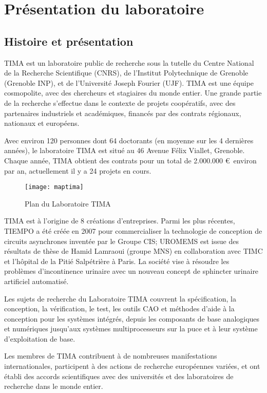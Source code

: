 \chapter{Présentation du laboratoire}
\label{chap:presentation}
\OnehalfSpacing

\section{Histoire et présentation}
TIMA est un laboratoire public de recherche sous la tutelle du Centre National de la Recherche Scientifique 
(CNRS), de l'Institut Polytechnique de Grenoble (Grenoble INP), et de l'Université Joseph Fourier (UJF). 
TIMA est une équipe cosmopolite, avec des chercheurs et stagiaires du monde entier. Une grande partie de la recherche s'effectue dans le contexte de projets coopératifs, avec des partenaires industriels et académiques, financés par des contrats régionaux, nationaux et européens.

Avec environ 120 personnes dont 64 doctorants (en moyenne sur les 4 dernières années), le laboratoire TIMA est situé au 46 Avenue Félix Viallet, Grenoble. Chaque année, TIMA obtient des contrats pour un total de 2.000.000 \euro\  environ par an, actuellement il y a 24 projets en cours.
\begin{figure}[h]
	\label{fig:maptima}
	\centering
	\texttt{[image: maptima]}
	\caption{Plan du Laboratoire TIMA}
	\vspace{-5mm}
\end{figure}

\justify
TIMA est à l'origine de 8 créations d'entreprises. Parmi les plus récentes, TIEMPO a été créée en 2007 pour commercialiser la technologie de conception de circuits asynchrones inventée par le Groupe CIS; UROMEMS est issue des résultats de thèse de Hamid Lamraoui (groupe MNS) en collaboration avec TIMC et l'hôpital de la Pitié Salpétrière à Paris. La société vise à résoudre les problèmes d'incontinence urinaire avec un nouveau concept de sphincter urinaire artificiel automatisé.

Les sujets de recherche du Laboratoire TIMA couvrent la spécification, la conception, la vérification, le test, les outils CAO et méthodes d'aide à la conception pour les systèmes intégrés, depuis les composants de base analogiques et numériques jusqu'aux systèmes multiprocesseurs sur la puce et à leur système d'exploitation de base.

Les membres de TIMA contribuent à de nombreuses manifestations internationales, participent à des actions de recherche européennes variées, et ont établi des accords scientifiques avec des universités et des laboratoires de recherche dans le monde entier.

